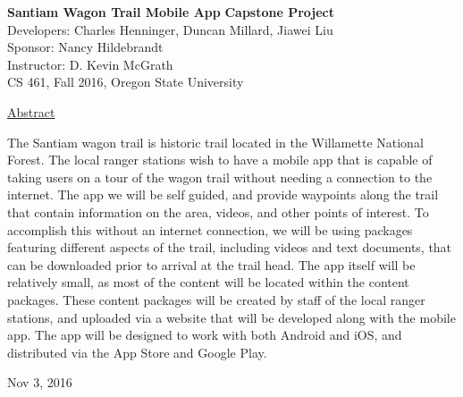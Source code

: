 \documentclass[letterpaper, 10pt,titlepage]{article}
\begin{document}
\begin{titlepage}
\begin{center}
    \Huge
    \textbf{Santiam Wagon Trail Mobile App}
    \textbf{Capstone Project}\\
    \vspace{1.0cm}
    \large
    Developers: Charles Henninger, Duncan Millard, Jiawei Liu\\
    Sponsor: Nancy Hildebrandt\\
    \vspace{1.5cm}
    \large
    Instructor: D. Kevin McGrath\\

    \large
    CS 461, Fall 2016, Oregon State University\\    

    \vspace{3.2cm}

    \large
    \underline{Abstract}\\
    \vspace{0.3cm}
    \end{center}
    \large

    The Santiam wagon trail is historic trail located in the Willamette National Forest. The local ranger stations wish to have a mobile app that is capable of taking users on a tour of the wagon trail without needing a connection to the internet. The app we will be self guided, and provide waypoints along the trail that contain information on the area, videos, and other points of interest. To accomplish this without an internet connection, we will be using packages featuring different aspects of the trail, including videos and text documents, that can be downloaded prior to arrival at the trail head. The app itself will be relatively small, as most of the content will be located within the content packages.  These content packages will be created by staff of the local ranger stations, and uploaded via a website that will be developed along with the mobile app. The app will be designed to work with both Android and iOS, and distributed via the App Store and Google Play.
    
    \vspace{0.8cm}
    \vfill
    
\begin{center}    
    Nov 3, 2016

\end{center}
\end{titlepage}


\tableofcontents
\newpage
\end{document}
